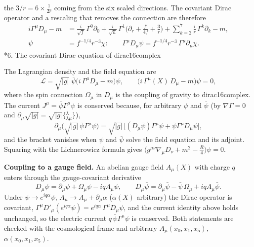 \documentclass[10pt,a4paper]{article}
\makeatletter
\renewcommand\section{\@startsection{section}{1}{\z@}{-3.5ex \@plus -1ex \@minus -.2ex}{2.3ex \@plus.2ex}{\normalfont\Large\bfseries\raggedright}}
\makeatother
\begin{document}
the $3/r=6\times\frac{1}{2r}$ coming from the six scaled directions. The covariant Dirac operator and a rescaling that removes the connection are therefore
\begin{align*}
i\Gamma^\mu D_\mu-m&=\frac{i}{\sqrt f}\,\Gamma^0\partial_0+\frac{i}{\sqrt h}\,\Gamma^1\Big(\partial_r+\frac{f'}{4f}+\frac3r\Big)+\sum_{k=2}^{7}\frac{i}{r}\,\Gamma^k\partial_k-m, \\
\psi&=f^{-1/4}r^{-3}\chi:\qquad \Gamma^\mu D_\mu\psi=f^{-1/4}r^{-3}\,\Gamma^\mu\partial_\mu\chi .
\end{align*}
\section*{6. The covariant Dirac equation of dirac16complex}
The Lagrangian density and the field equation are
\begin{equation*}
\mathcal L=\sqrt{|g|}\;\bar\psi\big(i\,\Gamma^\mu D_\mu-m\big)\psi,\qquad \big(i\,\Gamma^\mu(X)\,D_\mu-m\big)\psi=0,
\end{equation*}
where the spin connection $\Omega_\mu$ in $D_\mu$ is the coupling of gravity to dirac16complex. The current $J^\mu=\bar\psi\Gamma^\mu\psi$ is conserved because, for arbitrary $\psi$ and $\bar\psi$ (by $\nabla\Gamma=0$ and $\partial_\mu\sqrt{|g|}=\sqrt{|g|}\{{}^{\lambda}_{\lambda\mu}\}$),
\begin{equation*}
\partial_\mu\big(\sqrt{|g|}\,\bar\psi\Gamma^\mu\psi\big)=\sqrt{|g|}\,\big[(D_\mu\bar\psi)\Gamma^\mu\psi+\bar\psi\Gamma^\mu D_\mu\psi\big],
\end{equation*}
and the bracket vanishes when $\psi$ and $\bar\psi$ solve the field equation and its adjoint. Squaring with the Lichnerowicz formula gives $\big(g^{\mu\nu}\nabla_\mu D_\nu+m^2-\tfrac{R}{4}\big)\psi=0$.

\textbf{Coupling to a gauge field.} An abelian gauge field $A_\mu(X)$ with charge $q$ enters through the gauge-covariant derivative
\begin{equation*}
D_\mu\psi=\partial_\mu\psi+\Omega_\mu\psi-iqA_\mu\psi,\qquad D_\mu\bar\psi=\partial_\mu\bar\psi-\bar\psi\,\Omega_\mu+iqA_\mu\bar\psi .
\end{equation*}
Under $\psi\to e^{iq\alpha}\psi$, $A_\mu\to A_\mu+\partial_\mu\alpha$ ($\alpha(X)$ arbitrary) the Dirac operator is covariant, $\Gamma^\mu D'_\mu(e^{iq\alpha}\psi)=e^{iq\alpha}\,\Gamma^\mu D_\mu\psi$, and the current identity above holds unchanged, so the electric current $q\,\bar\psi\Gamma^\mu\psi$ is conserved. Both statements are checked with the cosmological frame and arbitrary $A_\mu(x_0,x_1,x_5)$, $\alpha(x_0,x_1,x_5)$.
\end{document}
